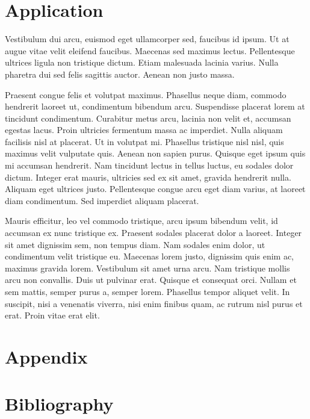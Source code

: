 \documentclass[11pt,twoside,a4paper]{article}
\begin{document}
	\section{Application}
	Vestibulum dui arcu, euismod eget ullamcorper sed, faucibus id ipsum. Ut at augue vitae velit eleifend faucibus. Maecenas sed maximus lectus. Pellentesque ultrices ligula non tristique dictum. Etiam malesuada lacinia varius. Nulla pharetra dui sed felis sagittis auctor. Aenean non justo massa.
	
	Praesent congue felis et volutpat maximus. Phasellus neque diam, commodo hendrerit laoreet ut, condimentum bibendum arcu. Suspendisse placerat lorem at tincidunt condimentum. Curabitur metus arcu, lacinia non velit et, accumsan egestas lacus. Proin ultricies fermentum massa ac imperdiet. Nulla aliquam facilisis nisl at placerat. Ut in volutpat mi. Phasellus tristique nisl nisl, quis maximus velit vulputate quis. Aenean non sapien purus. Quisque eget ipsum quis mi accumsan hendrerit. Nam tincidunt lectus in tellus luctus, eu sodales dolor dictum. Integer erat mauris, ultricies sed ex sit amet, gravida hendrerit nulla. Aliquam eget ultrices justo. Pellentesque congue arcu eget diam varius, at laoreet diam condimentum. Sed imperdiet aliquam placerat.
	
	Mauris efficitur, leo vel commodo tristique, arcu ipsum bibendum velit, id accumsan ex nunc tristique ex. Praesent sodales placerat dolor a laoreet. Integer sit amet dignissim sem, non tempus diam. Nam sodales enim dolor, ut condimentum velit tristique eu. Maecenas lorem justo, dignissim quis enim ac, maximus gravida lorem. Vestibulum sit amet urna arcu. Nam tristique mollis arcu non convallis. Duis ut pulvinar erat. Quisque et consequat orci. Nullam et sem mattis, semper purus a, semper lorem. Phasellus tempor aliquet velit. In suscipit, nisi a venenatis viverra, nisi enim finibus quam, ac rutrum nisl purus et erat. Proin vitae erat elit.
	\cite{kokoszka_introduction_2017}
	
	\section{Appendix}
	
	\section{Bibliography}
	\printbibliography	
	
\end{document}
